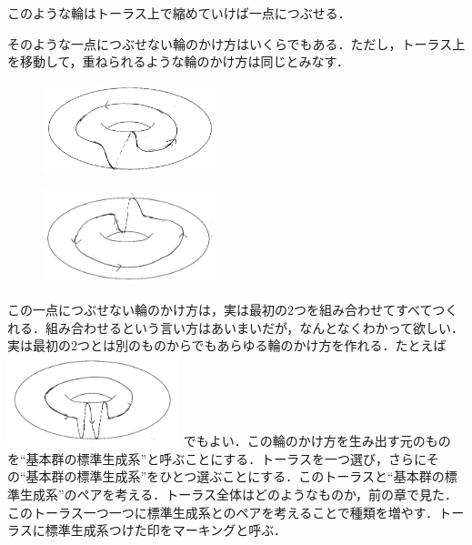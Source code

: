 このような輪はトーラス上で縮めていけば一点につぶせる．

そのような一点につぶせない輪のかけ方はいくらでもある．ただし，トーラス上を移動して，重ねられるような輪のかけ方は同じとみなす．\\
\begin{figure}[h]
\begin{minipage}{0.5\hsize}
\includegraphics[width=5cm]{asaka12.png}\\
\end{minipage}
\begin{minipage}{0.5\hsize}
\includegraphics[width=5cm]{asaka121.png}\\
\end{minipage}
\end{figure}
この一点につぶせない輪のかけ方は，実は最初の$2$つを組み合わせてすべてつくれる．組み合わせるという言い方はあいまいだが，なんとなくわかって欲しい．
\newpage
実は最初の$2$つとは別のものからでもあらゆる輪のかけ方を作れる．たとえば\\
\includegraphics[width=5cm]{asaka14.png}
でもよい．この輪のかけ方を生み出す元のものを``基本群の標準生成系''と呼ぶことにする．トーラスを一つ選び，さらにその``基本群の標準生成系''をひとつ選ぶことにする．このトーラスと``基本群の標準生成系''のペアを考える．トーラス全体はどのようなものか，前の章で見た．このトーラス一つ一つに標準生成系とのペアを考えることで種類を増やす．トーラスに標準生成系つけた印をマーキングと呼ぶ．

